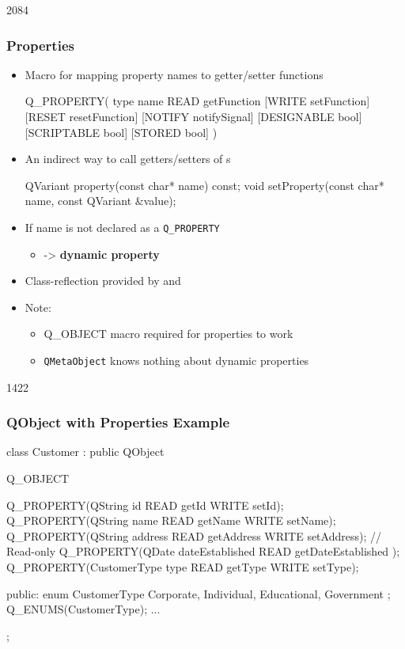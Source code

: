 \begin{slide}[fragile]{2084}
\frametitle{Properties}
\begin{itemize}
  \item Macro for mapping property names to getter/setter functions
\begin{cpp}
  Q_PROPERTY( type name READ getFunction [WRITE setFunction]
  [RESET resetFunction] [NOTIFY notifySignal] [DESIGNABLE bool]
  [SCRIPTABLE bool] [STORED bool] )
\end{cpp}
  \vspace*{0.5em}
  \item An indirect way to call getters/setters of s
\begin{cpp}
  QVariant property(const char* name) const;
  void setProperty(const char* name, const QVariant &value);
\end{cpp}
  \vspace*{0.5em}
  \item If name is not declared as a \texttt{Q\_PROPERTY}
  \begin{itemize}
    \item[] -> \textbf{dynamic property}
  \end{itemize}
  \vspace*{0.5em}
  \item Class-reflection provided by  and 
  \vspace*{0.5em}
  \item Note:
  \begin{itemize}
    \item Q\_OBJECT macro required for properties to work
    \item \texttt{QMetaObject} knows nothing about dynamic properties
  \end{itemize}
\end{itemize}
\end{slide}

\begin{slide}[fragile]{1422}
\frametitle{QObject with Properties Example}
\begin{cpp}
class Customer : public QObject
{
    Q_OBJECT

    Q_PROPERTY(QString id READ getId WRITE setId);
    Q_PROPERTY(QString name READ getName WRITE setName);
    Q_PROPERTY(QString address READ getAddress WRITE setAddress);
    // Read-only
    Q_PROPERTY(QDate dateEstablished READ getDateEstablished );
    Q_PROPERTY(CustomerType type READ getType WRITE setType);

  public:
    enum CustomerType {
      Corporate, Individual, Educational, Government
    };
    Q_ENUMS(CustomerType);
    ...
};
\end{cpp}
\end{slide}

